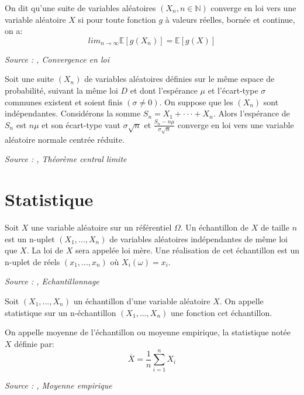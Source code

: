 \begin{definition}\label{def:convergence_loi}
On dit qu'une suite de variables aléatoires $(X_n, n\in \mathbb{N})$ converge en loi vers une variable aléatoire $X$ si pour toute fonction $g$ à valeurs réelles, bornée et continue, on a:
$$lim_{n \rightarrow \infty} \mathbb{E}[g(X_n)] = \mathbb{E}[g(X)]$$

\noindent\textit{Source : \cite{ensta_cours}, Convergence en loi}
\end{definition}

\begin{definition}\label{def:tcl}
Soit une suite $(X_n)$ de variables aléatoires définies sur le même espace de probabilité, suivant la même loi $D$ et dont l’espérance $\mu$ et l’écart-type $\sigma$ communes existent et soient finis $(\sigma \ne 0)$. On suppose que les $(X_n)$ sont indépendantes. Considérons la somme $S_n = X_1 + · · · + X_n$. Alors l’espérance de $S_n$ est $n\mu$ et son écart-type vaut $\sigma\sqrt{n}$ et $\frac{S_n - n\mu}{\sigma\sqrt{n}}$ converge en loi vers une variable aléatoire normale centrée réduite.

\noindent\textit{Source : \cite{statistique_inferentielle},  Théorème central limite}
\end{definition}


\section{Statistique}

\begin{definition}\label{def:echantillon}
Soit $X$ une variable aléatoire sur un référentiel $\Omega$. 
Un échantillon de $X$ de taille $n$ est un n-uplet $(X_1, . . . , X_n)$ de variables aléatoires indépendantes de même loi que $X$. La loi de $X$ sera appelée loi mère. Une réalisation de cet échantillon est un n-uplet de réels $(x_1, . . . , x_n)$ où $X_i(\omega) = x_i$.

\noindent\textit{Source : \cite{statistique_inferentielle},  Echantillonnage}
\end{definition}

\begin{definition}\label{def:statistique}
Soit $(X_1, . . . , X_n)$ un échantillon d'une variable aléatoire $X$.
On appelle statistique sur un n-échantillon $(X_1, . . . , X_n)$ une fonction cet échantillon.
\end{definition}

\begin{definition}\label{def:moyenne_empirique}
On appelle moyenne de l’échantillon ou moyenne empirique, la statistique notée $X$
définie par:
$$\overline{X} = \frac{1}{n}\sum_{i = 1}^n X_i$$

\noindent\textit{Source : \cite{statistique_inferentielle},  Moyenne empirique}
\end{definition}

